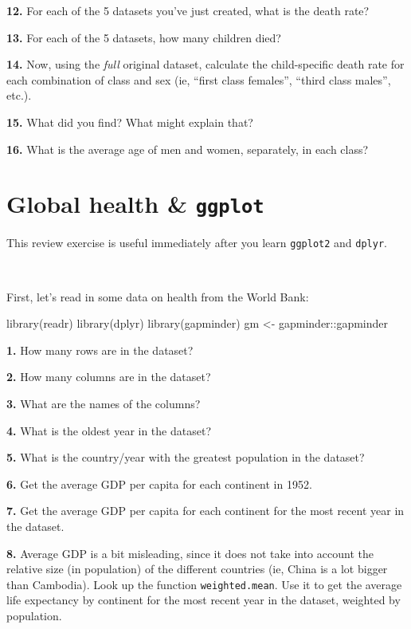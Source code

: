 \documentclass[
]{book}
\newenvironment{Shaded}{\begin{snugshade}}{\end{snugshade}}
\newcommand{\FunctionTok}[1]{\textcolor[rgb]{0.00,0.00,0.00}{#1}}
\newcommand{\NormalTok}[1]{#1}
\newcommand{\OtherTok}[1]{\textcolor[rgb]{0.56,0.35,0.01}{#1}}
\newcommand{\SpecialCharTok}[1]{\textcolor[rgb]{0.00,0.00,0.00}{#1}}
\begin{document}
\textbf{12.} For each of the 5 datasets you've just created, what is the death rate?

\textbf{13.} For each of the 5 datasets, how many children died?

\textbf{14.} Now, using the \emph{full} original dataset, calculate the child-specific death rate for each combination of class and sex (ie, ``first class females'', ``third class males'', etc.).

\textbf{15.} What did you find? What might explain that?

\textbf{16.} What is the average age of men and women, separately, in each class?

\hypertarget{global-health-ggplot}{%
\chapter{\texorpdfstring{Global health \& \texttt{ggplot}}{Global health \& ggplot}}\label{global-health-ggplot}}

This review exercise is useful immediately after you learn \texttt{ggplot2} and \texttt{dplyr}.

~

First, let's read in some data on health from the World Bank:

\begin{Shaded}
\begin{Highlighting}[]
\FunctionTok{library}\NormalTok{(readr)}
\FunctionTok{library}\NormalTok{(dplyr)}
\FunctionTok{library}\NormalTok{(gapminder)}
\NormalTok{gm }\OtherTok{\textless{}{-}}\NormalTok{ gapminder}\SpecialCharTok{::}\NormalTok{gapminder}
\end{Highlighting}
\end{Shaded}

\textbf{1.} How many rows are in the dataset?

\textbf{2.} How many columns are in the dataset?

\textbf{3.} What are the names of the columns?

\textbf{4.} What is the oldest year in the dataset?

\textbf{5.} What is the country/year with the greatest population in the dataset?

\textbf{6.} Get the average GDP per capita for each continent in 1952.

\textbf{7.} Get the average GDP per capita for each continent for the most recent year in the dataset.

\textbf{8.} Average GDP is a bit misleading, since it does not take into account the relative size (in population) of the different countries (ie, China is a lot bigger than Cambodia). Look up the function \texttt{weighted.mean}. Use it to get the average life expectancy by continent for the most recent year in the dataset, weighted by population.
\end{document}
